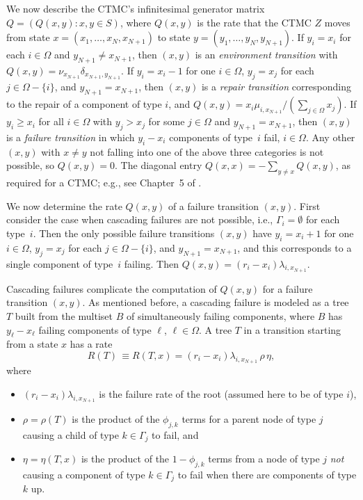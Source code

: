 \documentclass[12pt]{article}
\newcommand{\changed}[1]{#1}
\newcommand{\changed}[1]{\textcolor{red}{#1}}
\begin{document}
We now describe the CTMC's infinitesimal generator matrix $Q = (Q(x, y) : x, y
\in S)$, where $Q(x, y)$ is the rate that the CTMC $Z$ moves from state $x =
(x_1, \ldots, x_N, x_{N + 1})$ to state $y = (y_1, \ldots, y_N, y_{N + 1})$. If
$y_i = x_i$ for each $i \in \Omega$ and $y_{N + 1} \neq x_{N + 1}$, then $(x,
y)$ is an \textit{environment transition} with $Q(x, y) = \nu_{x_{N + 1}}
\delta_{x_{N + 1},y_{N + 1}}$. If $y_i = x_i - 1$ for one $i \in \Omega$, $y_j =
x_j$ for each $j \in \Omega - \{ i \}$, and $y_{N + 1} = x_{N + 1}$, then $(x,
y)$ is a \textit{repair transition} corresponding to the repair of a component
of type $i$, and $Q(x, y) = x_i \mu_{i,x_{N + 1}}/(\sum_{j \in \Omega} x_j)$. If
$y_i \geq x_i$ for all $i \in \Omega$ with $y_j > x_j$ for some $j \in \Omega$
and $y_{N + 1} = x_{N + 1}$, then $(x, y)$ is a \textit{failure transition} in
which $y_i - x_i$ components of type~$i$ fail, $i \in \Omega$. Any other $(x,
y)$ with $x \neq y$ not falling into one of the above three categories is not
possible, so $Q(x, y) = 0$. The diagonal entry $Q(x, x) = -\sum_{y \neq x} Q(x,
y)$, as required for a CTMC; e.g., see Chapter~5 of
\cite{Ross:1995}.

We now determine the rate $Q(x, y)$ of a failure transition $(x, y)$. First
consider the case when cascading failures are not possible, i.e., $\Gamma_i =
\emptyset$ for each type~$i$. Then the only possible failure transitions $(x ,
y)$ have $y_i = x_i + 1$ for one $i \in \Omega$, $y_j = x_j$ for each $j \in
\Omega - \{ i \}$, and $y_{N + 1} = x_{N + 1}$, and this corresponds to a single
component of type~$i$ failing. Then $Q(x, y) = (r_i - x_i) \lambda_{i, x_{N +
1}}$.

Cascading failures complicate the computation of $Q(x, y)$ for a failure
transition $(x, y)$. As mentioned before, a cascading failure is modeled as a
tree $T$ built from the multiset $B$ of simultaneously failing components, where
$B$ has $y_\ell - x_\ell$ failing components of type $\ell$, $\ell \in \Omega$.
A tree $T$
\changed{in a transition starting
from a state $x$}
has a rate
\begin{equation}
\label{eq:rate}
R(T)
\changed{ \, \equiv
R(T,x)}
= (r_i - x_i) \lambda_{i,x_{N + 1}} \, \rho \, \eta,
\end{equation}
where
\begin{itemize}
\item $(r_i - x_i) \lambda_{i,x_{N + 1}}$ is the failure rate of the root
(assumed here to be of type $i$),
\item $\rho = \rho(T)$ is the product of the
$\phi_{j, k}$ terms for a parent node of type $j$ causing a child of type $k \in
\Gamma_j$ to fail, and
\item $\eta = \eta(T,x)$ is the product of the $1 - \phi_{j, k}$ terms from a
node of type $j$ \textit{not} causing a component of type $k \in \Gamma_j$ to
fail when there are components of type $k$ up.
\end{itemize}
\end{document}
